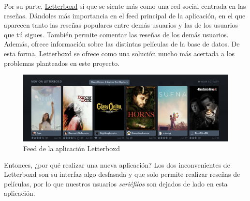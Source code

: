 Por su parte, \href{https://letterboxd.com}{Letterboxd} sí que se siente más como una red social centrada en las reseñas. Dándoles más importancia en el feed principal de la aplicación, en el que aparecen tanto las reseñas populares entre demás usuarios y las de los usuarios que tú sigues. También permite comentar las reseñas de los demás usuarios. Además, ofrece información sobre las distintas películas de la base de datos. De esta forma, Letterboxd se ofrece como una solución mucho más acertada a los problemas planteados en este proyecto.\\
\begin{figure}[H]
    \centering	
    \includegraphics[scale=0.4]{img/letterboxd-feed.png}
    \caption{ Feed de la aplicación Letterboxd }
    \label{fig:letterboxd}
\end{figure}

Entonces, ¿por qué realizar una nueva aplicación? Los dos inconvenientes de Letterboxd son su interfaz algo desfasada y que solo permite realizar reseñas de películas, por lo que nuestros usuarios \textit{seriéfilos} son dejados de lado en esta aplicación.
